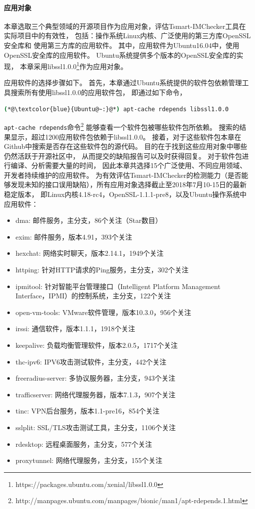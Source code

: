 \paragraph{应用对象}
本章选取三个典型领域的开源项目作为应用对象，评估Tsmart-IMChecker工具在实际项目中的有效性，
包括：操作系统Linux内核、广泛使用的第三方库OpenSSL安全库和
使用第三方库的应用软件。
其中，应用软件为Ubuntu16.04中，使用OpenSSL安全库的应用软件。
Ubuntu系统提供多个版本的OpenSSL安全库的实现，
本章采用libssl1.0.0\footnote{https://packages.ubuntu.com/xenial/libssl1.0.0}作为应用对象。

应用软件的选择步骤如下。
首先，本章通过Ubuntu系统提供的软件包依赖管理工具搜索所有使用libssl1.0.0的应用软件包，
即通过如下命令，
\begin{lstlisting}[language={bash},
basicstyle=\linespread{0.8}\listingsfont,
numbers=none,
xleftmargin=.25\textwidth]
(*@\textcolor{blue}{Ubuntu@~:}@*) apt-cache rdepends libssl1.0.0
\end{lstlisting}
\texttt{apt-cache rdepends}命令\footnote{http://manpages.ubuntu.com/manpages/bionic/man1/apt-rdepends.1.html}
能够查看一个软件包被哪些软件包所依赖。
搜索的结果显示，超过1200应用软件包依赖于libssl1.0.0。
接着，对于这些软件包本章在Github中搜索是否存在这些软件包的源代码。
目的在于找到这些应用对象中哪些仍然活跃于开源社区中，
从而提交的缺陷报告可以及时获得回复。
对于软件包进行编译、分析需要大量的时间，
因此本章共选择15个广泛使用、不同应用领域、开发者持续维护的应用软件。
为有效评估Tsmart-IMChecker的检测能力（是否能够发现未知的接口误用缺陷），所有应用对象选择截止至2018年7月10-15日的最新稳定版本，
即Linux内核4.18-rc4，OpenSSL-1.1.1-pre8，以及Ubuntu操作系统中应用软件：
\begin{itemize}
	\item dma: 邮件服务，主分支，86个关注（Star数目）
	\item exim: 邮件服务，版本4.91，393个关注
	\item hexchat: 网络实时聊天，版本2.14.1，1949个关注
	\item httping: 针对HTTP请求的Ping服务，主分支，302个关注
	\item ipmitool: 针对智能平台管理接口（Intelligent Platform Management Interface，IPMI）的控制系统，主分支，122个关注
	\item open-vm-tools: VMware软件管理，版本10.3.0，956个关注
	\item irssi: 通信软件，版本1.1.1，1918个关注
	\item keepalive: 负载均衡管理软件，版本2.0.5，1717个关注
	\item thc-ipv6: IPV6攻击测试软件，主分支，442个关注
	\item freeradius-server: 多协议服务器，主分支，943个关注
	\item trafficserver: 网络代理服务器，版本7.1.3，907个关注
	\item tinc: VPN后台服务，版本1.1-pre16，854个关注
	\item sslplit: SSL/TLS攻击测试工具，主分支，1106个关注
	\item rdesktop: 远程桌面服务，主分支，577个关注
	\item proxytunnel: 网络代理服务，主分支，155个关注
\end{itemize}

